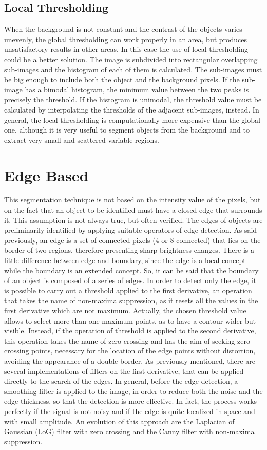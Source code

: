 \documentclass[final,a4paper,12pt,english]{UnicaPhdThesis3}
\begin{document}
	\subsection{Local Thresholding} \label{LT} %
	When the background is not constant and the contrast of the objects varies unevenly, the global thresholding can work properly in an area, but produces unsatisfactory results in other areas. In this case the use of local thresholding could be a better solution. The image is subdivided into rectangular overlapping sub-images and the histogram of each of them is calculated. The sub-images must be big enough to include both the object and the background pixels. If the sub-image has a bimodal histogram, the minimum value between the two peaks is precisely the threshold. If the histogram is unimodal, the threshold value must be calculated by interpolating the thresholds of the adjacent sub-images, instead. In general, the local thresholding is computationally more expensive than the global one, although it is very useful to segment objects from the background and to extract very small and scattered variable regions.
	
	\section{Edge Based} %
	This segmentation technique is not based on the intensity value of the pixels, but on the fact that an object to be identified must have a closed edge that surrounds it. This assumption is not always true, but often verified. The edges of objects are preliminarily identified by applying suitable operators of edge detection. As said previously, an edge is a set of connected pixels (4 or 8 connected) that lies on the border of two regions, therefore presenting sharp brightness changes. There is a little difference between edge and boundary, since the edge is a local concept while the boundary is an extended concept. So, it can be said that the boundary of an object is composed of a series of edges.
	In order to detect only the edge, it is possible to carry out a threshold applied to the first derivative, an operation that takes the name of non-maxima suppression, as it resets all the values ​​in the first derivative which are not maximum. Actually, the chosen threshold value allows to select more than one maximum points, as to have a contour wider but visible. Instead, if the operation of threshold is applied to the second derivative, this operation takes the name of zero crossing and has the aim of seeking zero crossing points, necessary for the location of the edge points without distortion, avoiding the appearance of a double border. As previously mentioned, there are several implementations of filters on the first derivative, that can be applied directly to the search of the edges. In general, before the edge detection, a smoothing filter is applied to the image, in order to reduce both the noise and the edge thickness, so that the detection is more effective. In fact, the process works perfectly if the signal is not noisy and if the edge is quite localized in space and with small amplitude. An evolution of this approach are the Laplacian of Gaussian (\acs{LoG}) filter with zero crossing and the Canny filter with non-maxima suppression.
	
\end{document}

